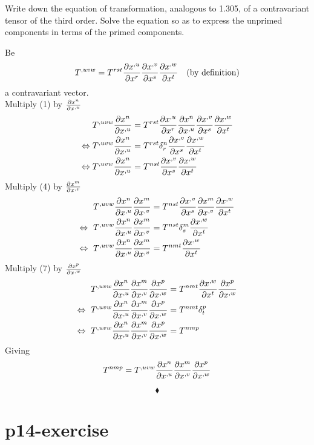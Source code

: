 \begin{tcolorbox}
Write down the equation of transformation, analogous to 1.305, of a contravariant tensor of the third order. Solve the equation so as to express the unprimed components in terms of the primed components.

\end{tcolorbox}
Be 
\begin{align}
T^{,uvw}=T^{rst} \pdv{x^{,u}}{x^r}\pdv{x^{,v}}{x^s}\pdv{x^{,w}}{x^t}\quad\text{(by definition)}
\end{align}
a contravariant vector.\\
Multiply (1) by $\pdv{x^{n}}{x^{,u}}$
\begin{align}
\ T^{,uvw}\pdv{x^{n}}{x^{,u}}&= T^{rst} \pdv{x^{,u}}{x^r}\pdv{x^{n}}{x^{,u}}\pdv{x^{,v}}{x^s}\pdv{x^{,w}}{x^t}\\
\Leftrightarrow  T^{,uvw}\pdv{x^{n}}{x^{,u}}&= T^{rst} \delta^{n}_{r}\pdv{x^{,v}}{x^s}\pdv{x^{,w}}{x^t}\\
\Leftrightarrow  T^{,uvw}\pdv{x^{n}}{x^{,u}}&= T^{nst} \pdv{x^{,v}}{x^s}\pdv{x^{,w}}{x^t}
\end{align}
Multiply (4) by $\pdv{x^{m}}{x^{,v}}$
\begin{align}
\ T^{,uvw}\pdv{x^{n}}{x^{,u}}\pdv{x^{m}}{x^{,v}} &= T^{nst} \pdv{x^{,v}}{x^s}\pdv{x^{m}}{x^{,v}}\pdv{x^{,w}}{x^t}\\
\Leftrightarrow  \ T^{,uvw}\pdv{x^{n}}{x^{,u}}\pdv{x^{m}}{x^{,v}} &= T^{nst} \delta_{s}^{m}\pdv{x^{,w}}{x^t}\\
\Leftrightarrow  \ T^{,uvw}\pdv{x^{n}}{x^{,u}}\pdv{x^{m}}{x^{,v}} &= T^{nmt} \pdv{x^{,w}}{x^t}
\end{align}
Multiply (7) by $\pdv{x^{p}}{x^{,w}}$
\begin{align}
\ T^{,uvw}\pdv{x^{n}}{x^{,u}}\pdv{x^{m}}{x^{,v}}\pdv{x^{p}}{x^{,w}} &= T^{nmt} \pdv{x^{,w}}{x^t}\pdv{x^{p}}{x^{,w}}\\
\Leftrightarrow \ T^{,uvw}\pdv{x^{n}}{x^{,u}}\pdv{x^{m}}{x^{,v}}\pdv{x^{p}}{x^{,w}} &= T^{nmt} \delta^{p}_{t}\\
\Leftrightarrow  \ T^{,uvw}\pdv{x^{n}}{x^{,u}}\pdv{x^{m}}{x^{,v}}\pdv{x^{p}}{x^{,w}} &= T^{nmp} 
\end{align}
Giving
$$T^{nmp} =  T^{,uvw}\pdv{x^{n}}{x^{,u}}\pdv{x^{m}}{x^{,v}}\pdv{x^{p}}{x^{,w}} $$

$$\blacklozenge$$
\pagebreak[4]

\section{p14-exercise}

